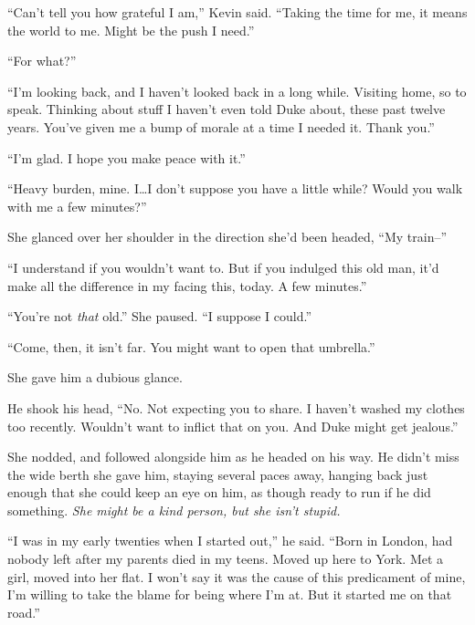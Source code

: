 ``Can't tell you how grateful I am,'' Kevin said.  ``Taking the time for me, it means the world to me.  Might be the push I need.''



``For what?''



``I'm looking back, and I haven't looked back in a long while.  Visiting home, so to speak.  Thinking about stuff I haven't even told Duke about, these past twelve years.  You've given me a bump of morale at a time I needed it.  Thank you.''



``I'm glad.  I hope you make peace with it.''



``Heavy burden, mine.  I\ldots I don't suppose you have a little while?  Would you walk with me a few minutes?''



She glanced over her shoulder in the direction she'd been headed, ``My train--''



``I understand if you wouldn't want to.  But if you indulged this old man, it'd make all the difference in my facing this, today.  A few minutes.''



``You're not \emph{that} old.''  She paused.  ``I suppose I could.''



``Come, then, it isn't far.  You might want to open that umbrella.''



She gave him a dubious glance.



He shook his head, ``No.  Not expecting you to share.  I haven't washed my clothes too recently.  Wouldn't want to inflict that on you.  And Duke might get jealous.''



She nodded, and followed alongside him as he headed on his way.  He didn't miss the wide berth she gave him, staying several paces away, hanging back just enough that she could keep an eye on him, as though ready to run if he did something.  \emph{She might be a kind person, but she isn't stupid.}



``I was in my early twenties when I started out,'' he said.  ``Born in London, had nobody left after my parents died in my teens.  Moved up here to York.  Met a girl, moved into her flat.  I won't say it was the cause of this predicament of mine, I'm willing to take the blame for being where I'm at.  But it started me on that road.''



